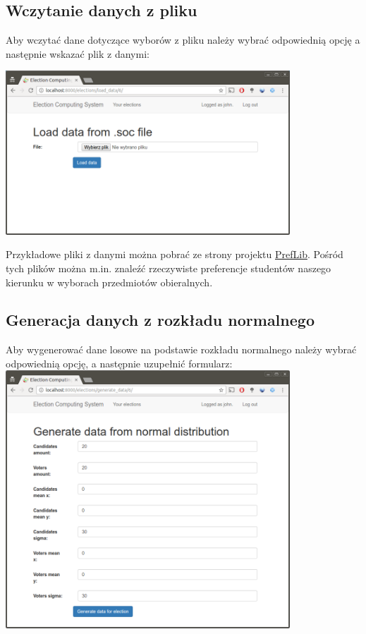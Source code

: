 \documentclass[pdflatex,11pt]{../aghdoc}
\begin{document}
\subsection{Wczytanie danych z pliku}
\label{subsec:wczytaniezpliku}

Aby wczytać dane dotyczące wyborów z pliku należy wybrać odpowiednią opcję a następnie wskazać plik z danymi:

\includegraphics[width=0.8\textwidth]{pics/load-from-file.png}

Przykładowe pliki z danymi można pobrać ze strony projektu \href{http://www.preflib.org/data/packs/index.php#soc}{PrefLib}. Pośród tych plików można m.in. znaleźć rzeczywiste preferencje studentów naszego kierunku w wyborach przedmiotów obieralnych.

\newpage
\subsection{Generacja danych z rozkładu normalnego}
\label{subsec:generowaniedanych}

Aby wygenerować dane losowe na podstawie rozkładu normalnego należy wybrać odpowiednią opcję, a następnie uzupełnić formularz:
\includegraphics[width=0.8\textwidth]{pics/generate-distribution.png}
\end{document}
